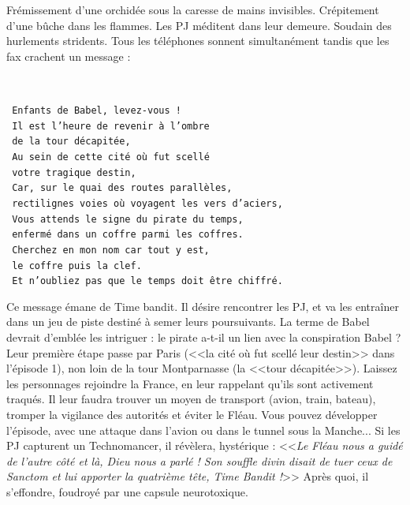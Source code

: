 \documentclass[11pt,twoside,a4paper]{book}
\begin{document}
Fr{\'e}missement d'une orchid{\'e}e sous la caresse de mains invisibles. Cr{\'e}pitement d'une b{\^u}che dans les flammes. Les PJ m{\'e}ditent dans leur demeure. Soudain des hurlements stridents. Tous les t{\'e}l{\'e}phones sonnent simultan{\'e}ment tandis que les fax crachent un message :~\\

\begin{minipage}[ht]{0.15\textwidth}
		~\\
\end{minipage} \hfill \begin{minipage}[ht]{0.80\textwidth}
		\texttt{ Enfants de Babel, levez-vous !}~\\
		\texttt{ Il est l'heure de revenir {\`a} l'ombre}~\\
		\texttt{ de la tour d{\'e}capit{\'e}e,}~\\
		\texttt{ Au sein de cette cit{\'e} o{\`u} fut scell{\'e}}~\\
		\texttt{ votre tragique destin,}~\\
		\texttt{ Car, sur le quai des routes parall{\`e}les,}~\\
		\texttt{ rectilignes voies o{\`u} voyagent les vers d'aciers,}~\\
		\texttt{ Vous attends le signe du pirate du temps,}~\\
		\texttt{ enferm{\'e} dans un coffre parmi les coffres.}~\\
		\texttt{ Cherchez en mon nom car tout y est,}~\\
		\texttt{ le coffre puis la clef.}~\\
		\texttt{ Et n'oubliez pas que le temps doit {\^e}tre chiffr{\'e}.}~\\
\end{minipage}

Ce message {\'e}mane de Time bandit. Il d{\'e}sire rencontrer les PJ, et va les entra{\^i}ner dans un jeu de piste destin{\'e} {\`a} semer leurs poursuivants. La terme de Babel devrait d'embl{\'e}e les intriguer : le pirate a-t-il un lien avec la conspiration Babel ? Leur premi{\`e}re {\'e}tape passe par Paris (<<la cit{\'e} o{\`u} fut scell{\'e} leur destin>> dans l'{\'e}pisode 1), non loin de la tour Montparnasse (la <<tour d{\'e}capit{\'e}e>>). Laissez les personnages rejoindre la France, en leur rappelant qu'ils sont activement traqu{\'e}s. Il leur faudra trouver un moyen de transport (avion, train, bateau), tromper la vigilance des autorit{\'e}s et {\'e}viter le Fl{\'e}au. Vous pouvez d{\'e}velopper l'{\'e}pisode, avec une attaque dans l'avion ou dans le tunnel sous la Manche... Si les PJ capturent un Technomancer, il r{\'e}v{\`e}lera, hyst{\'e}rique : <<\emph{Le Fl{\'e}au nous a guid{\'e} de l'autre c{\^o}t{\'e} et l{\`a}, Dieu nous a parl{\'e} ! Son souffle divin disait de tuer ceux de Sanctom et lui apporter la quatri{\`e}me t{\^e}te, Time Bandit !}>> Apr{\`e}s quoi, il s'effondre, foudroy{\'e} par une capsule neurotoxique.~\\
\end{document}
